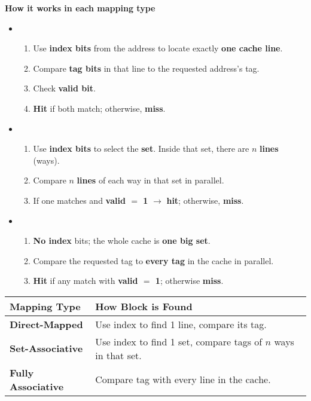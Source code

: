 \begin{flushleft}
    \textcolor{Green3}{ \textbf{How it works in each mapping type}}
\end{flushleft}
\begin{itemize}
    \item {}
    \begin{enumerate}
        \item Use \textbf{index bits} from the address to locate exactly \textbf{one cache line}.
        \item Compare \textbf{tag bits} in that line to the requested address's tag.
        \item Check \textbf{valid bit}.
        \item \textbf{Hit} if both match; otherwise, \textbf{miss}.
    \end{enumerate}
    \item {}
    \begin{enumerate}
        \item Use \textbf{index bits} to select the \textbf{set}. Inside that set, there are $n$ \textbf{lines} (ways).
        \item Compare $n$ \textbf{lines} of each way in that set in parallel.
        \item If one matches and \textbf{valid $=$ 1} $\rightarrow$ \textbf{hit}; otherwise, \textbf{miss}.
    \end{enumerate}
    \item {}
    \begin{enumerate}
        \item \textbf{No index} bits; the whole cache is \textbf{one big set}.
        \item Compare the requested tag to \textbf{every tag} in the cache in parallel.
        \item \textbf{Hit} if any match with \textbf{valid $=$ 1}; otherwise \textbf{miss}.
    \end{enumerate}
\end{itemize}

\begin{table}[!htp]
    \centering
    \begin{tabular}{@{} l p{24em} @{}}
        \toprule
        Mapping Type & How Block is Found \\
        \midrule
        \textbf{Direct-Mapped}       & Use index to find 1 line, compare its tag.                        \\ [.3em]
        \textbf{Set-Associative}     & Use index to find 1 set, compare tags of $n$ ways in that set.    \\ [.3em]
        \textbf{Fully Associative}   & Compare tag with every line in the cache.                         \\
        \bottomrule
    \end{tabular}
\end{table}